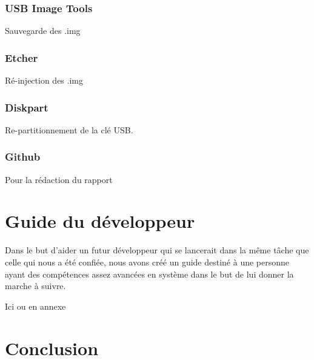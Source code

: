 \documentclass[final]{polytech/polytech}
\begin{document}
\section{USB Image Tools}
Sauvegarde des .img

\section{Etcher}
Ré-injection des .img

\section{Diskpart}
Re-partitionnement de la clé USB.

\section{Github}
Pour la rédaction du rapport

\part{Guide du développeur}
Dans le but d'aider un futur développeur qui se lancerait dans la même tâche que celle qui nous a été confiée, nous avons créé un guide destiné à une personne ayant des compétences assez avancées en système dans le but de lui donner la marche à suivre.

Ici ou en annexe

\part{Conclusion}
\end{document}
